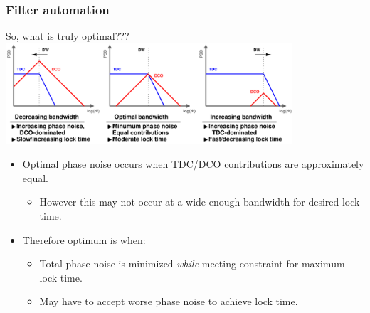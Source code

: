 \documentclass[t, screen, aspectratio=43]{beamer}
\begin{document}
\begin{frame}
	\frametitle{Filter automation}
	\begin{block}{So, what is truly optimal???}
			\center\includegraphics[width=0.8\textwidth, angle=0]{loop_bandwidth.pdf}
		\begin{itemize}
			\scriptsize
			\item Optimal phase noise occurs when TDC/DCO contributions are approximately equal. 
			\begin{itemize}
				\scriptsize
				\item However this may not occur at a wide enough bandwidth for desired lock time.
			\end{itemize}
			\item Therefore optimum is when:
			\begin{itemize}
				\scriptsize
				\item Total phase noise is minimized \textit{while} meeting constraint for maximum lock time.
				\item May have to accept worse phase noise to achieve lock time.
			\end{itemize}

		\end{itemize}    
	\end{block}
\end{frame}
\end{document}
